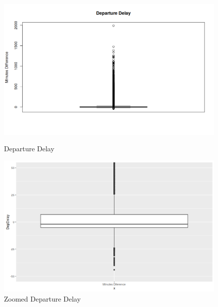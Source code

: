 \documentclass{article}
\begin{document}
    \begin{figure}[H]
      \includegraphics[width=\linewidth]{r_plots/box_dep_delay.png}
      \caption{Departure Delay}
      \label{fig:graph1}
      \includegraphics[width=\linewidth]{r_plots/box_dep_delay_zoom.png}
      \caption{Zoomed Departure Delay}
      \label{fig:graph1}
    \end{figure}
\end{document}
